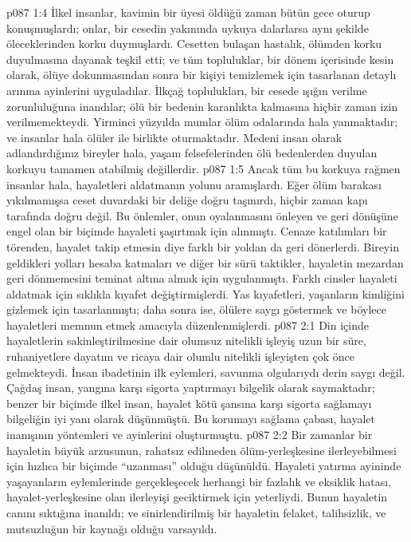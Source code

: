 \vs p087 1:4 İlkel insanlar, kavimin bir üyesi öldüğü zaman bütün gece oturup konuşmuşlardı; onlar, bir cesedin yakınında uykuya dalarlarsa aynı şekilde öleceklerinden korku duymuşlardı. Cesetten bulaşan hastalık, ölümden korku duyulmasına dayanak teşkil etti; ve tüm topluluklar, bir dönem içerisinde kesin olarak, ölüye dokunmasından sonra bir kişiyi temizlemek için tasarlanan detaylı arınma ayinlerini uyguladılar. İlkçağ toplulukları, bir cesede ışığın verilme zorunluluğuna inandılar; ölü bir bedenin karanlıkta kalmasına hiçbir zaman izin verilmemekteydi. Yirminci yüzyılda mumlar ölüm odalarında hala yanmaktadır; ve insanlar hala ölüler ile birlikte oturmaktadır. Medeni insan olarak adlandırdığınız bireyler hala, yaşam felsefelerinden ölü bedenlerden duyulan korkuyu tamamen atabilmiş değillerdir.
\vs p087 1:5 Ancak tüm bu korkuya rağmen insanlar hala, hayaletleri aldatmanın yolunu aramışlardı. Eğer ölüm barakası yıkılmamışsa ceset duvardaki bir deliğe doğru taşınırdı, hiçbir zaman kapı tarafında doğru değil. Bu önlemler, onun oyalanmasını önleyen ve geri dönüşüne engel olan bir biçimde hayaleti şaşırtmak için alınmıştı. Cenaze katılımları bir törenden, hayalet takip etmesin diye farklı bir yoldan da geri dönerlerdi. Bireyin geldikleri yolları hesaba katmaları ve diğer bir sürü taktikler, hayaletin mezardan geri dönmemesini teminat altına almak için uygulanmıştı. Farklı cinsler hayaleti aldatmak için sıklıkla kıyafet değiştirmişlerdi. Yas kıyafetleri, yaşanların kimliğini gizlemek için tasarlanmıştı; daha sonra ise, ölülere saygı göstermek ve böylece hayaletleri memnun etmek amacıyla düzenlenmişlerdi.
\vs p087 2:1 Din içinde hayaletlerin sakinleştirilmesine dair olumsuz nitelikli işleyiş uzun bir süre, ruhaniyetlere dayatım ve ricaya dair olumlu nitelikli işleyişten çok önce gelmekteydi. İnsan ibadetinin ilk eylemleri, savunma olgularıydı derin saygı değil. Çağdaş insan, yangına karşı sigorta yaptırmayı bilgelik olarak saymaktadır; benzer bir biçimde ilkel insan, hayalet kötü şansına karşı sigorta sağlamayı bilgeliğin iyi yanı olarak düşünmüştü. Bu korumayı sağlama çabası, hayalet inanışının yöntemleri ve ayinlerini oluşturmuştu.
\vs p087 2:2 Bir zamanlar bir hayaletin büyük arzusunun, rahatsız edilmeden ölüm\hyp{}yerleşkesine ilerleyebilmesi için hızlıca bir biçimde “uzanması” olduğu düşünüldü. Hayaleti yatırma ayininde yaşayanların eylemlerinde gerçekleşecek herhangi bir fazlalık ve eksiklik hatası, hayalet\hyp{}yerleşkesine olan ilerleyişi geciktirmek için yeterliydi. Bunun hayaletin canını sıktığına inanıldı; ve sinirlendirilmiş bir hayaletin felaket, talihsizlik, ve mutsuzluğun bir kaynağı olduğu varsayıldı.
